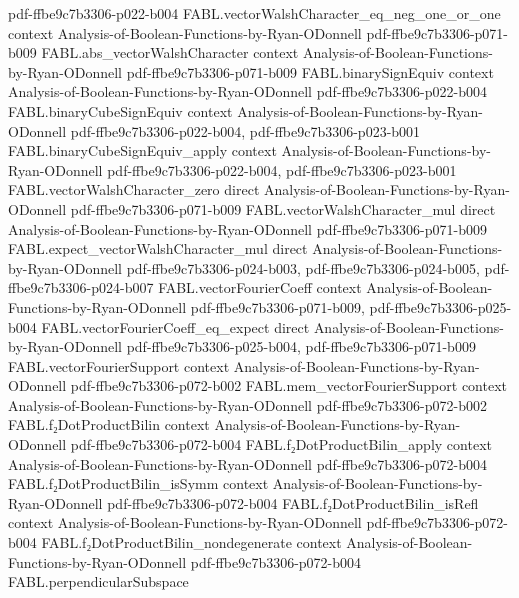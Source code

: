 \begin{theorem}
  {pdf-ffbe9c7b3306-p022-b004}
\proofstep
  {FABL.vectorWalshCharacter_eq_neg_one_or_one}
  {context}
  {Analysis-of-Boolean-Functions-by-Ryan-ODonnell}
  {pdf-ffbe9c7b3306-p071-b009}
\proofstep
  {FABL.abs_vectorWalshCharacter}
  {context}
  {Analysis-of-Boolean-Functions-by-Ryan-ODonnell}
  {pdf-ffbe9c7b3306-p071-b009}
\proofstep
  {FABL.binarySignEquiv}
  {context}
  {Analysis-of-Boolean-Functions-by-Ryan-ODonnell}
  {pdf-ffbe9c7b3306-p022-b004}
\proofstep
  {FABL.binaryCubeSignEquiv}
  {context}
  {Analysis-of-Boolean-Functions-by-Ryan-ODonnell}
  {pdf-ffbe9c7b3306-p022-b004,
    pdf-ffbe9c7b3306-p023-b001}
\proofstep
  {FABL.binaryCubeSignEquiv_apply}
  {context}
  {Analysis-of-Boolean-Functions-by-Ryan-ODonnell}
  {pdf-ffbe9c7b3306-p022-b004,
    pdf-ffbe9c7b3306-p023-b001}
\proofstep
  {FABL.vectorWalshCharacter_zero}
  {direct}
  {Analysis-of-Boolean-Functions-by-Ryan-ODonnell}
  {pdf-ffbe9c7b3306-p071-b009}
\proofstep
  {FABL.vectorWalshCharacter_mul}
  {direct}
  {Analysis-of-Boolean-Functions-by-Ryan-ODonnell}
  {pdf-ffbe9c7b3306-p071-b009}
\proofstep
  {FABL.expect_vectorWalshCharacter_mul}
  {direct}
  {Analysis-of-Boolean-Functions-by-Ryan-ODonnell}
  {pdf-ffbe9c7b3306-p024-b003,
    pdf-ffbe9c7b3306-p024-b005,
    pdf-ffbe9c7b3306-p024-b007}
\proofstep
  {FABL.vectorFourierCoeff}
  {context}
  {Analysis-of-Boolean-Functions-by-Ryan-ODonnell}
  {pdf-ffbe9c7b3306-p071-b009,
    pdf-ffbe9c7b3306-p025-b004}
\proofstep
  {FABL.vectorFourierCoeff_eq_expect}
  {direct}
  {Analysis-of-Boolean-Functions-by-Ryan-ODonnell}
  {pdf-ffbe9c7b3306-p025-b004,
    pdf-ffbe9c7b3306-p071-b009}
\proofstep
  {FABL.vectorFourierSupport}
  {context}
  {Analysis-of-Boolean-Functions-by-Ryan-ODonnell}
  {pdf-ffbe9c7b3306-p072-b002}
\proofstep
  {FABL.mem_vectorFourierSupport}
  {context}
  {Analysis-of-Boolean-Functions-by-Ryan-ODonnell}
  {pdf-ffbe9c7b3306-p072-b002}
\proofstep
  {FABL.f₂DotProductBilin}
  {context}
  {Analysis-of-Boolean-Functions-by-Ryan-ODonnell}
  {pdf-ffbe9c7b3306-p072-b004}
\proofstep
  {FABL.f₂DotProductBilin_apply}
  {context}
  {Analysis-of-Boolean-Functions-by-Ryan-ODonnell}
  {pdf-ffbe9c7b3306-p072-b004}
\proofstep
  {FABL.f₂DotProductBilin_isSymm}
  {context}
  {Analysis-of-Boolean-Functions-by-Ryan-ODonnell}
  {pdf-ffbe9c7b3306-p072-b004}
\proofstep
  {FABL.f₂DotProductBilin_isRefl}
  {context}
  {Analysis-of-Boolean-Functions-by-Ryan-ODonnell}
  {pdf-ffbe9c7b3306-p072-b004}
\proofstep
  {FABL.f₂DotProductBilin_nondegenerate}
  {context}
  {Analysis-of-Boolean-Functions-by-Ryan-ODonnell}
  {pdf-ffbe9c7b3306-p072-b004}
\proofstep
  {FABL.perpendicularSubspace}

\end{theorem}
